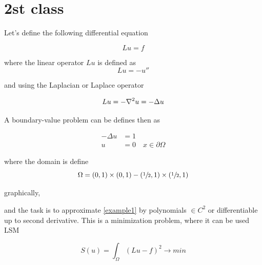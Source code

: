 \chapter{2st class }

Let's define the following differential equation 

\begin{equation}
	Lu = f
\end{equation}

where the linear operator $Lu$ is defined as 
\begin{equation}
	Lu = -u''
\end{equation}

 and using the Laplacian or Laplace operator
 
\begin{equation}
Lu = - \laplacian{u} = - \Delta u
\end{equation}

A boundary-value problem can be defines then as

\begin{equation}
\label{example1}
\begin{split}
- \Delta u & = 1 \\
u & = 0  \quad  x \in \partial{\Omega}
\end{split}
\end{equation}

where  the domain is define 
\begin{equation}
\Omega = (0,1) \times (0,1) - (\sfrac{1}{2},1) \times (\sfrac{1}{2},1) 
\end{equation}

graphically, 

 \begin{center}
\end{center} 

and the task is to approximate \eqref{example1} by polynomials $\in C^2$ or differentiable up to second derivative. This is a minimization problem, where it can be used LSM 

\begin{equation}
S(u) = \int_{\Omega} (Lu - f)^2 \rightarrow min
\end{equation}

